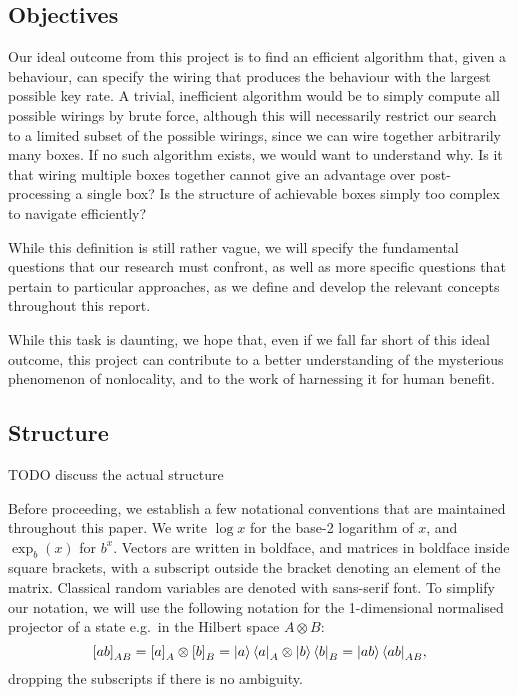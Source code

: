 \documentclass[10pt, a4paper]{article}
\numberwithin{equation}{section} %
\theoremstyle{definition}
\theoremstyle{plain}
\newcommand{\?}{\mathrel{?}} %
\newcommand{\proj}[2][]{{[#2]}_{#1}}
\begin{document}
  \subsection{Objectives}

  Our ideal outcome from this project is to find an efficient algorithm that, given a behaviour, can specify the wiring that produces the behaviour with the largest possible key rate. A trivial, inefficient algorithm would be to simply compute all possible wirings by brute force, although this will necessarily restrict our search to a limited subset of the possible wirings, since we can wire together arbitrarily many boxes. If no such algorithm exists, we would want to understand why. Is it that wiring multiple boxes together cannot give an advantage over post-processing a single box? Is the structure of achievable boxes simply too complex to navigate efficiently?

  While this definition is still rather vague, we will specify the fundamental questions that our research must confront, as well as more specific questions that pertain to particular approaches, as we define and develop the relevant concepts throughout this report.

  While this task is daunting, we hope that, even if we fall far short of this ideal outcome, this project can contribute to a better understanding of the mysterious phenomenon of nonlocality, and to the work of harnessing it for human benefit.

  \subsection{Structure}

  TODO discuss the actual structure

  Before proceeding, we establish a few notational conventions that are maintained throughout this paper. We write \(\log x\) for the base-2 logarithm of \(x\), and \(\exp_b(x)\) for \(b^x\). Vectors are written in boldface, and matrices in boldface inside square brackets, with a subscript outside the bracket denoting an element of the matrix. Classical random variables are denoted with sans-serif font. To simplify our notation, we will use the following notation for the 1-dimensional normalised projector of a state e.g.\ in the Hilbert space \(A \otimes B\):
  \[ \proj[AB]{ab} = \proj[A]{a} \otimes \proj[B]{b} = {\ket{a}\bra{a}}_A \otimes {\ket{b}\bra{b}}_B = {\ket{ab}\bra{ab}}_{AB},\]
  dropping the subscripts if there is no ambiguity.
\end{document}
